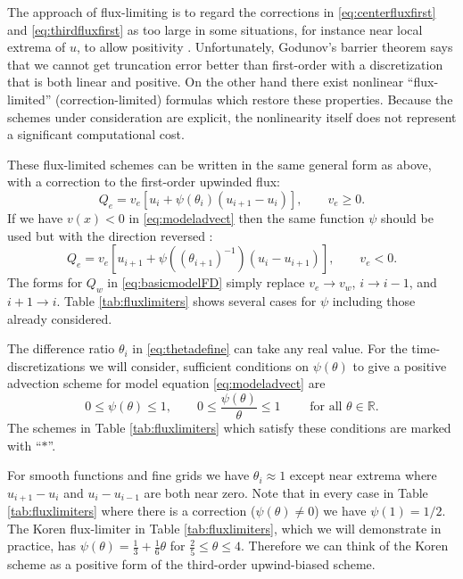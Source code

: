 \documentclass[11pt,final]{amsart}%
\newcommand\RR{\mathbb{R}}
\begin{document}
The approach of flux-limiting is to regard the corrections in \eqref{eq:centerfluxfirst} and \eqref{eq:thirdfluxfirst} as too large in some situations, for instance near local extrema of $u$, to allow positivity \citep[section III.1.1]{HundsdorferVerwer2010}.  Unfortunately, Godunov's barrier theorem \citep[section I.7.1]{HundsdorferVerwer2010} says that we cannot get truncation error better than first-order with a discretization that is both linear and positive.  On the other hand there exist nonlinear ``flux-limited'' (correction-limited) formulas which restore these properties.  Because the schemes under consideration are explicit, the nonlinearity itself does not represent a significant computational cost.

These flux-limited schemes can be written in the same general form as above, with a correction to the first-order upwinded flux:
\begin{equation}
Q_e = v_e \left[u_i + \psi(\theta_i) (u_{i+1} - u_i)\right], \qquad v_e \ge 0. \label{eq:fluxlimiterform}
\end{equation}
If we have $v(x)<0$ in \eqref{eq:modeladvect} then the same function $\psi$ should be used but with the direction reversed \citep[section III.1.1]{HundsdorferVerwer2010}:
\begin{equation}
Q_e = v_e \left[u_{i+1} + \psi\left((\theta_{i+1})^{-1}\right) (u_i - u_{i+1})\right], \qquad v_e < 0. \label{eq:fluxlimiterformreversed}
\end{equation}
The forms for $Q_w$ in \eqref{eq:basicmodelFD} simply replace $v_e \to v_w$, $i\to i-1$, and $i+1\to i$.  Table \ref{tab:fluxlimiters} shows several cases for $\psi$ including those already considered.

The difference ratio $\theta_i$ in \eqref{eq:thetadefine} can take any real value.  For the time-discretizations we will consider, sufficient conditions on $\psi(\theta)$ to give a positive advection scheme for model equation \eqref{eq:modeladvect} are
\begin{equation}
0 \le \psi(\theta) \le 1, \qquad 0 \le \frac{\psi(\theta)}{\theta} \le 1 \qquad \text{ for all } \theta \in \RR.
\end{equation}
The schemes in Table \ref{tab:fluxlimiters} which satisfy these conditions are marked with ``$\ast$''.

For smooth functions and fine grids we have $\theta_i\approx 1$ except near extrema where $u_{i+1} - u_i$ and $u_i - u_{i-1}$ are both near zero.  Note that in every case in Table \ref{tab:fluxlimiters} where there is a correction ($\psi(\theta)\ne 0$) we have $\psi(1)=1/2$.  The Koren flux-limiter in Table \ref{tab:fluxlimiters}, which we will demonstrate in practice, has $\psi(\theta) = \frac{1}{3}+\frac{1}{6} \theta$ for $\frac{2}{5} \le \theta \le 4$.  Therefore we can think of the Koren scheme as a positive form of the third-order upwind-biased scheme.
\end{document}
